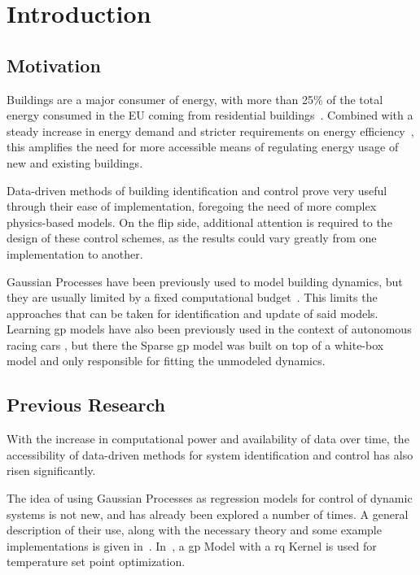\section{Introduction}

\subsection{Motivation}

Buildings are a major consumer of energy, with more than 25\% of the total
energy consumed in the EU coming from residential
buildings~\cite{tsemekiditzeiranakiAnalysisEUResidential2019}. Combined with a
steady increase in energy demand and stricter requirements on energy
efficiency~\cite{europeancommission.jointresearchcentre.EnergyConsumptionEnergy2018},
this amplifies the need for more accessible means of regulating energy usage of
new and existing buildings.

Data-driven methods of building identification and control prove very useful
through their ease of implementation, foregoing the need of more complex
physics-based models. On the flip side, additional attention is required to the
design of these control schemes, as the results could vary greatly from one
implementation to another.

Gaussian Processes have been previously used to model building dynamics, but
they are usually limited by a fixed computational
budget~\cite{jainLearningControlUsing2018,nghiemDatadrivenDemandResponse2017}.
This limits the approaches that can be taken for identification and update of
said models.  Learning \acrfull{gp} models have also been previously used in
the context of autonomous racing cars
\cite{kabzanLearningBasedModelPredictive2019}, but there the Sparse
\acrshort{gp} model was built on top of a white-box model and only responsible
for fitting the unmodeled dynamics.

\subsection{Previous Research}
With the increase in computational power and availability of data  over time,
the accessibility of data-driven methods for system identification and control
has also risen significantly. 

The idea of using Gaussian Processes as regression models for control of dynamic
systems is not new, and has already been explored a number of times. A general
description of their use, along with the necessary theory and some example
implementations is given in~\cite{kocijanModellingControlDynamic2016}.
In~\cite{pleweSupervisoryModelPredictive2020}, a \acrshort{gp} Model with a
\acrlong{rq} Kernel is used for temperature set point optimization.

